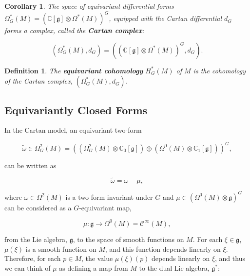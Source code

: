 \documentclass{article}
\newtheorem{corollary}[theorem]{Corollary}
\newtheorem{defn}[theorem]{Definition\rm}
\newcommand{\lra}{\longrightarrow}
\newcommand{\w}{\omega}
\newcommand{\W}{\Omega}
\newcommand{\CC}{\mathbb{C}}
\newcommand{\mfg}{\mathfrak{g}}
\newcommand{\mc}[1]{\mathcal{#1}}
\begin{document}
\begin{corollary}
	The space of equivariant differential forms $\W_{G}^{\ast}(M) = \left( \CC[\mfg] \otimes \W^{\ast}(M) \right)^{G}$, equipped with the Cartan differential $d_{G}$ forms a complex, called the \textbf{Cartan complex}:
	
	\begin{equation*}
		\left( \W_{G}^{\ast}(M), d_{G} \right) = \left( (\CC[\mfg] \otimes \W^{\ast}(M)   )^{G}, d_{G} \right).
	\end{equation*}

\end{corollary}

\begin{defn}
	The \textbf{equivariant cohomology} $H_{G}^{\ast}(M)$ of $M$ is the cohomology of the Cartan complex, $(\W_{G}^{\ast}(M), d_{G})$.
\end{defn}

\subsection{Equivariantly Closed Forms}

In the Cartan model, an equivariant two-form

	\begin{equation*}
		\tilde{\w} \in \W_{G}^{2}(M) = \left( \left( \W_{G}^{2}(M) \otimes \CC_{0}[\mfg] \right) \oplus \left( \W^{0}(M) \otimes \CC_{1}[\mfg] \right) \right)^{G},
	\end{equation*} 

can be written as

	\begin{equation*}
		\tilde{\w} = \w - \mu,
	\end{equation*}

where $\w \in \W^{2}(M)$ is a two-form invariant under $G$ and $\mu \in \left( \W^{0}(M) \otimes \mfg \right)^{G}$ can be considered as a $G$-equivariant map,

	\begin{equation*}
		\mu : \mfg \lra \W^{0}(M) = \mc{C}^{\infty}(M),
	\end{equation*}

from the Lie algebra, $\mfg$, to the space of smooth functions on $M$. For each $\xi \in \mfg$, $\mu(\xi)$ is a smooth function on $M$, and this function depends linearly on $\xi$. Therefore, for each $p \in M$, the value $\mu(\xi)(p)$ depends linearly on $\xi$, and thus we can think of $\mu$ as defining a map from $M$ to the dual Lie algebra, $\mfg^{\ast}$:
\end{document}
